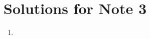 \documentclass[../main.tex]{subfiles}
\begin{document}
\section{Solutions for Note 3}
\begin{enumerate}
\item
\end{enumerate}
\end{document}
